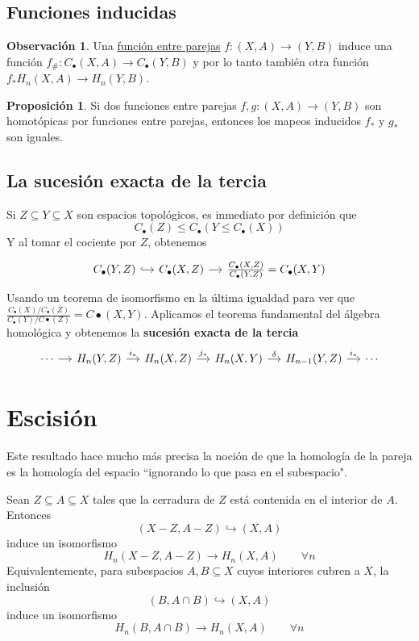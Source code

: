 \documentclass[spanish]{book}
\theoremstyle{definition}
\newtheorem*{obs}{Observación}
\newtheorem*{prop}{Proposición}
\begin{document}
\subsection{Funciones inducidas}
	\begin{obs}
		Una \hyperref[def:func-homot]{función entre parejas} $f:(X,A)\to(Y,B)$ induce una función $f_\#:C_\bullet(X,A)\to C_\bullet(Y,B)$ y por lo tanto también otra función $f_*H_n(X,A)\to H_n(Y,B)$.
	\end{obs}
	\begin{prop}
		Si dos funciones entre parejas $f,g:(X,A)\to(Y,B)$ son homotópicas por funciones entre parejas, entonces los mapeos inducidos $f_*$ y $g_*$ son iguales.
	\end{prop}
\subsection{La sucesión exacta de la tercia}
	Si $Z\subseteq Y\subseteq X$ son espacios topológicos, es inmediato por definición que
	\[C_\bullet(Z)\leq C_\bullet(Y\leq C_\bullet(X))\]
	Y al tomar el cociente por $Z$, obtenemos 
	\[\begin{tikzcd}[column sep=small]
		C_\bullet(Y,Z)\arrow[r,hook]&C_\bullet(X,Z)\arrow[r]&\frac{C_\bullet(X,Z)}{C_\bullet(Y,Z)}=C_\bullet(X,Y)
	\end{tikzcd}\]
	Usando un teorema de isomorfismo en la última igualdad para ver que $\frac{C_\bullet(X)/C_\bullet(Z)}{C_\bullet(Y)/C\bullet(Z)}=C\bullet(X,Y)$. Aplicamos el teorema fundamental del álgebra homológica y obtenemos la \textbf{sucesión exacta de la tercia}
	\[\begin{tikzcd}[column sep=small]
		\cdots\arrow[r]&H_n(Y,Z)\arrow[r,"i_*"]&H_n(X,Z)\arrow[r,"j_*"]&H_n(X,Y)\arrow[r,"\delta"]&H_{n-1}(Y,Z)\arrow[r,"i_*"]&\cdots
	\end{tikzcd}\]
\section{Escisión}
Este resultado hace mucho más precisa la noción de que la homología de la pareja es la homología del espacio ``ignorando lo que pasa en el subespacio".

Sean $Z\subseteq A\subseteq X$ tales que la cerradura de $Z$ está contenida en el interior de $A$. Entonces
\[(X-Z,A-Z)\hookrightarrow (X,A)\]
induce un isomorfismo
\[H_n(X-Z,A-Z)\to H_n(X,A)\qquad\forall n\]
Equivalentemente, para subespacios $A,B\subseteq X$ cuyos interiores cubren a $X$, la inclusión
\[(B,A\cap B)\hookrightarrow (X,A)\]
induce un isomorfismo
\[H_n(B,A\cap B)\to H_n(X,A)\qquad\forall n\]
\end{document}

